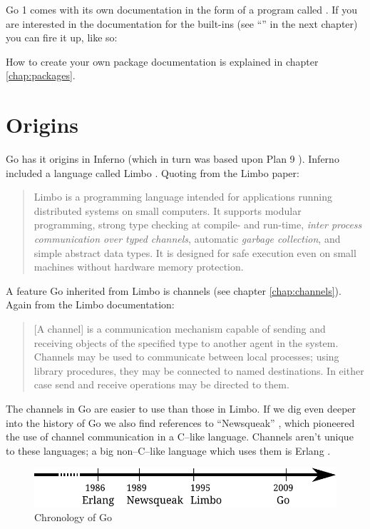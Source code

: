 Go 1 comes with its own documentation in the form of a program called 
. If you are interested in the documentation
for the built-ins (see ``'' in the next chapter) you
can fire it up, like so:
\begin{display}
\pr {}
\end{display}

How to create your own package documentation is explained in chapter \ref{chap:packages}.

\section{Origins}
Go has it origins in Inferno \cite{inferno} (which in turn was based
upon Plan 9 \cite{plan9}). Inferno included a language called Limbo
\cite{limbo}. Quoting from the Limbo paper:
\begin{quote}
Limbo is a programming language intended for applications running
distributed systems on small computers. It supports modular programming,
strong type checking at compile- and run-time, \emph{inter process
communication over typed channels}, automatic \emph{garbage collection}, and
simple abstract data types. It is designed for safe execution even on
small machines without hardware memory protection.
\end{quote}
A feature Go inherited from Limbo is channels (see chapter
\ref{chap:channels}). Again from the Limbo documentation:
\begin{quote}
[A channel] is a communication mechanism capable of sending and receiving objects of
the specified type to another agent in the system. Channels may be used
to communicate between local processes; using library procedures, they
may be connected to named destinations. In either case send and receive
operations may be directed to them.
\end{quote}
The channels in Go are easier to use than those in Limbo.
If we dig even deeper into the history of Go we also find references
to ``Newsqueak'' \cite{newsqueak}, which pioneered the use of 
channel communication in a C--like language. Channels
aren't unique to these languages; a big non--C--like
language which uses them is Erlang \cite{erlang}.

\begin{figure}[H]
\caption{Chronology of Go}
\label{fig:chrono-of-go}
\begin{center}
\includegraphics[scale=0.65]{fig/go-history.pdf}
\end{center}
\end{figure}

